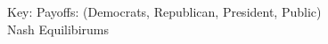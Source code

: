 \documentclass{article}
\begin{document}
\begin{comment}
\begin{game}{8}{2}[Public][President][Democrats Pick NP, Republicans Pick NP]
              &   V  &  NV  \\
(NF, NF, NR)  &  (-1,1,1,-1)  &  (-1,1,1,-1)  \\
(NF, NF, R)   &  (-1,1,1,-1)  &  (-1,1,1,-1)  \\
(NF, F, NR)   &  (-1,1,1,-1)  &  (-1,1,1,-1)  \\
(NF, F, R)    &  (-1,1,1,-1)  &  (-1,1,1,-1)  \\
(F, NF, NR)   &  (-2,2,2,-1)  &  (-2,2,2,-1)  \\
(F, NF, R)    &  (-2,2,2,-1)  &  (-2,2,2,-1)  \\
(F, F, NR)    &  (-2,2,2,-1)  &  (-2,2,2,-1)  \\
(F, F, R)     &  (-2,2,2,-1)  &  (-2,2,2,-1)  \\
\end{game}

\begin{game}{8}{2}[Public][President][Democrats Pick NP, Republicans Pick P]
              &   V  &  NV  \\
(NF, NF, NR)  &  (-1,1,1,-1)  &  (-1,1,1,-1)  \\
(NF, NF, R)   &  (-1,1,1,-1)  &  (-1,1,1,-1)  \\
(NF, F, NR)   &  (-1,1,1,-1)  &  (-1,1,1,-1)  \\
(NF, F, R)    &  (-1,1,1,-1)  &  (-1,1,1,-1)  \\
(F, NF, NR)   &  (-2,2,2,-1)  &  (-2,2,2,-1)  \\
(F, NF, R)    &  (-2,2,2,-1)  &  (-2,2,2,-1)  \\
(F, F, NR)    &  (-2,2,2,-1)  &  (-2,2,2,-1)  \\
(F, F, R)     &  (-2,2,2,-1)  &  (-2,2,2,-1)  \\
\end{game}
\end{comment}

Key:
\newline
Payoffs: (Democrats, Republican, President, Public) \\
\color{NashEquilibirum}Nash Equilibirums \\
\end{document}
